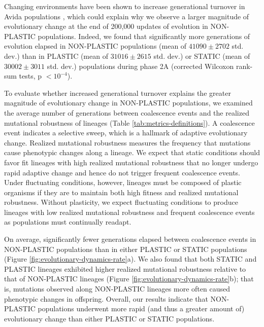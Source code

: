 Changing environments have been shown to increase generational turnover in Avida populations \citep{canino-koning_evolution_2016}, which could explain why we observe a larger magnitude of evolutionary change at the end of 200,000 updates of evolution in NON-PLASTIC populations. 
Indeed, we found that significantly more generations of evolution elapsed in NON-PLASTIC populations (mean of $41090\pm2702$ std. dev.) than in PLASTIC (mean of $31016\pm2615$ std. dev.) or STATIC (mean of $30002\pm3011$ std. dev.) populations during phase 2A (corrected Wilcoxon rank-sum tests, p $<10^{-4}$).

To evaluate whether increased generational turnover explains the greater magnitude of evolutionary change in NON-PLASTIC populations, we examined the average number of generations between coalescence events and the realized mutational robustness of lineages (Table \ref{tab:metrics-definitions}).
A coalescence event indicates a selective sweep, which is a hallmark of adaptive evolutionary change.
Realized mutational robustness measures the frequency that mutations cause phenotypic changes along a lineage.
We expect that static conditions should favor fit lineages with high realized mutational robustness that no longer undergo rapid adaptive change and hence do not trigger frequent coalescence events.
Under fluctuating conditions, however, lineages must be composed of plastic organisms if they are to maintain both high fitness and realized mutational robustness.
Without plasticity, we expect fluctuating conditions to produce lineages with low realized mutational robustness and frequent coalescence events as populations must continually readapt.



On average, significantly fewer generations elapsed between coalescence events in NON-PLASTIC populations than in either PLASTIC or STATIC populations (Figure \ref{fig:evolutionary-dynamics-rate}a).
We also found that both STATIC and PLASTIC lineages exhibited higher realized mutational robustness relative to that of NON-PLASTIC lineages (Figure \ref{fig:evolutionary-dynamics-rate}b); that is, mutations observed along NON-PLASTIC lineages more often caused phenotypic changes in offspring. 
Overall, our results indicate that NON-PLASTIC populations underwent more rapid (and thus a greater amount of) evolutionary change than either PLASTIC or STATIC populations. 


